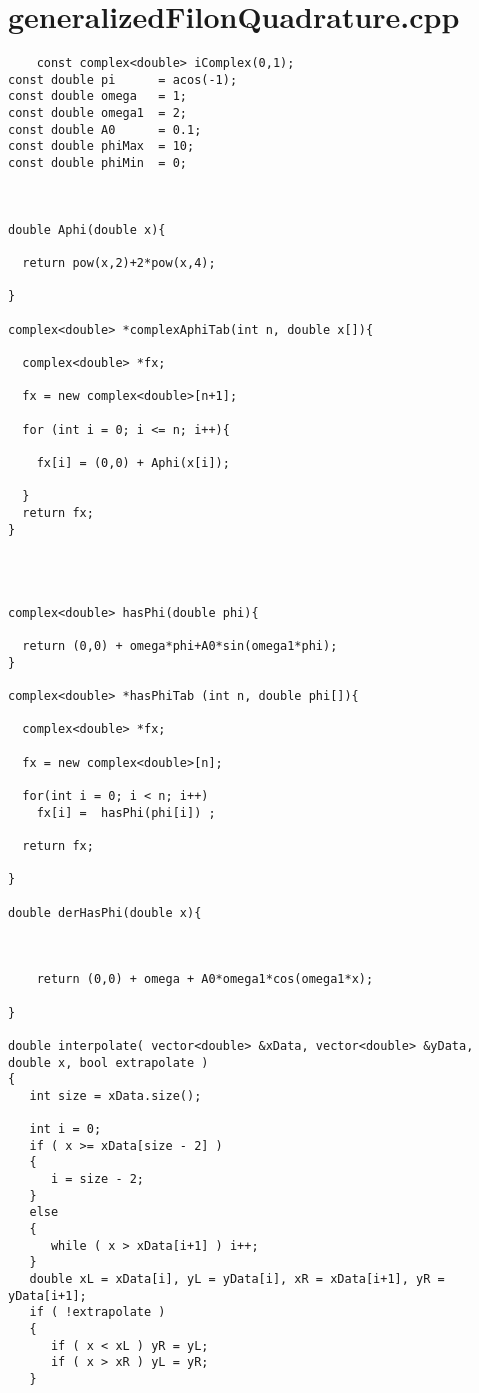 \pagebreak

\section{generalizedFilonQuadrature.cpp}

\begin{lstlisting}
    const complex<double> iComplex(0,1);
const double pi      = acos(-1);
const double omega   = 1;
const double omega1  = 2;
const double A0      = 0.1;
const double phiMax  = 10;
const double phiMin  = 0;



double Aphi(double x){

  return pow(x,2)+2*pow(x,4);

}

complex<double> *complexAphiTab(int n, double x[]){ 

  complex<double> *fx;
  
  fx = new complex<double>[n+1];
  
  for (int i = 0; i <= n; i++){

    fx[i] = (0,0) + Aphi(x[i]);

  }
  return fx;
}




complex<double> hasPhi(double phi){ 
  
  return (0,0) + omega*phi+A0*sin(omega1*phi);
}

complex<double> *hasPhiTab (int n, double phi[]){ 

  complex<double> *fx;

  fx = new complex<double>[n];

  for(int i = 0; i < n; i++)
    fx[i] =  hasPhi(phi[i]) ;

  return fx;

}

double derHasPhi(double x){

  

    return (0,0) + omega + A0*omega1*cos(omega1*x);

}

double interpolate( vector<double> &xData, vector<double> &yData, double x, bool extrapolate )
{
   int size = xData.size();

   int i = 0;                                                                  
   if ( x >= xData[size - 2] )                                                 
   {
      i = size - 2;
   }
   else
   {
      while ( x > xData[i+1] ) i++;
   }
   double xL = xData[i], yL = yData[i], xR = xData[i+1], yR = yData[i+1];      
   if ( !extrapolate )                                                         
   {
      if ( x < xL ) yR = yL;
      if ( x > xR ) yL = yR;
   }


\end{lstlisting}
